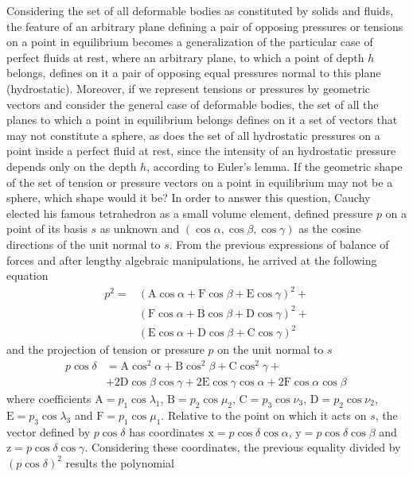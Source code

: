 Considering the set of all deformable bodies as constituted by solids and fluids, the feature of an arbitrary plane defining a pair of opposing pressures or tensions on a point in equilibrium becomes a generalization of the particular case of perfect fluids at rest, where an arbitrary plane, to which a point of depth $h$ belongs, defines on it a pair of opposing equal pressures normal to this plane (hydrostatic). Moreover, if we represent tensions or pressures by geometric vectors and consider the general case of deformable bodies, the set of all the planes to which a point in equilibrium belongs defines on it a set of vectors that may not constitute a sphere, as does the set of all hydrostatic pressures on a point inside a perfect fluid at rest, since the intensity of an hydrostatic pressure depends only on the depth $h$, according to Euler's lemma. If the geometric shape of the set of tension or pressure vectors on a point in equilibrium may not be a sphere, which shape would it be? In order to answer this question, Cauchy elected his famous tetrahedron as a small volume element, defined pressure $p$ on a point of its basis $s$ as unknown and $(\cos\alpha,\cos\beta,\cos\gamma)$ as the cosine directions of the unit normal to $s$. From the previous expressions of balance of forces and after lengthy algebraic manipulations, he arrived at the following equation
\begin{align*}
p^2 = &(\text{A}\cos\alpha+\text{F}\cos\beta+\text{E}\cos\gamma)^2+\\
&(\text{F}\cos\alpha+\text{B}\cos\beta+\text{D}\cos\gamma)^2+\\
&(\text{E}\cos\alpha+\text{D}\cos\beta+\text{C}\cos\gamma)^2
\end{align*}
and the projection of tension or pressure $p$ on the unit normal to $s$ 
\begin{align*}
p\cos\delta &= \text{A}\cos^2\alpha+\text{B}\cos^2\beta+\text{C}\cos^2\gamma+\\
&+2\text{D}\cos\beta\cos\gamma +2\text{E}\cos\gamma\cos\alpha+2\text{F}\cos\alpha\cos\beta\,
\end{align*}
where coefficients $\text{A} = p_1\cos\lambda_1$, $\text{B} = p_2\cos\mu_2$, $\text{C} = p_3\cos\nu_3$, $\text{D} = p_2\cos\nu_2$, $\text{E} = p_3\cos\lambda_3$ and $\text{F} = p_1\cos\mu_1$. Relative to the point on which it acts on $s$, the vector defined by $p\cos\delta$  has coordinates $\text{x}=p\cos\delta\cos\alpha$, $\text{y}=p\cos\delta\cos\beta$ and $\text{z}=p\cos\delta\cos\gamma$. Considering these coordinates, the previous equality divided by $(p\cos\delta)^2$ results the polynomial 

